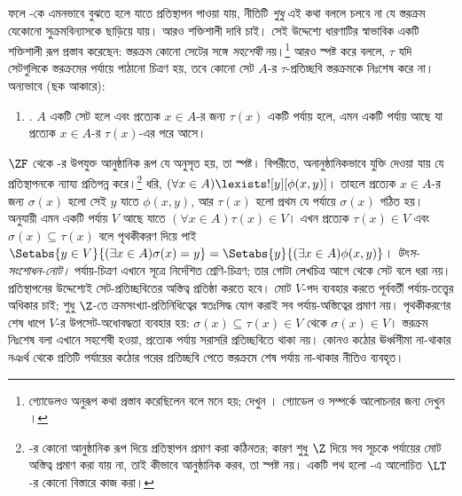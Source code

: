 \documentclass[../../../include/open-logic-section]{subfiles}
\begin{document}
ফলে \stagesinex{}-কে এমনভাবে বুঝতে
হলে যাতে প্রতিস্থাপন পাওয়া যায়,
নীতিটি \emph{শুধু} এই কথা বললে চলবে না
যে স্তরক্রম যেকোনো সুক্রমবিন্যাসকে
ছাড়িয়ে যায়। আরও শক্তিশালী দাবি চাই।
সেই উদ্দেশ্যে \cite{Shoenfield:AST}
ধারণাটির স্বাভাবিক একটি শক্তিশালী রূপ
প্রস্তাব করেছেন: স্তরক্রম কোনো সেটের
সঙ্গে \emph{সহশেষী} নয়।\footnote{গ্যোডেলও
অনুরূপ কথা প্রস্তাব করেছিলেন বলে মনে হয়;
দেখুন \citet[p.~223]{Potter2004}। গ্যোডেল
ও \citeauthor{Shoenfield:AST} সম্পর্কে
আলোচনার জন্য দেখুন
\citet[90--5]{Incurvati2020}।}
আরও স্পষ্ট করে বললে, $\tau$ যদি
সেটগুলিকে স্তরক্রমের পর্যায়ে পাঠানো
চিত্রণ হয়, তবে কোনো সেট $A$-র
$\tau$-প্রতিচ্ছবি স্তরক্রমকে নিঃশেষ
করে না। অন্যভাবে (ছক আকারে):
\begin{enumerate}
	\item[] \stagescofin. $A$ একটি সেট হলে
	এবং প্রত্যেক $x \in A$-র জন্য
	$\tau(x)$ একটি পর্যায় হলে, এমন একটি
	পর্যায় আছে যা প্রত্যেক $x \in A$-র
	$\tau(x)$-এর পরে আসে।
\end{enumerate}
$\ZF$ থেকে \stagescofin-র উপযুক্ত
আনুষ্ঠানিক রূপ যে অনুসৃত হয়, তা স্পষ্ট।
বিপরীতে, অনানুষ্ঠানিকভাবে যুক্তি দেওয়া যায়
যে \stagescofin{} প্রতিস্থাপনকে ন্যায্য
প্রতিপন্ন করে।\footnote{\stagescofin-র
কোনো আনুষ্ঠানিক রূপ দিয়ে প্রতিস্থাপন
প্রমাণ করা কঠিনতর; কারণ শুধু $\Z$ দিয়ে
সব সূচকে পর্যায়ের মোট অস্তিত্ব প্রমাণ করা যায় না,
তাই \stagescofin{} কীভাবে আনুষ্ঠানিক
করব, তা স্পষ্ট নয়। একটি পথ হলো
-এ
আলোচিত $\LT$-র কোনো বিস্তারে কাজ করা।}
ধরি, $(\forall x \in A)\lexists![y][\phi(x,y)]$।
তাহলে প্রত্যেক $x \in A$-র জন্য
$\sigma(x)$ হলো সেই $y$ যাতে
$\phi(x,y)$, আর $\tau(x)$ হলো প্রথম
যে পর্যায়ে $\sigma(x)$ গঠিত হয়।
\stagescofin{} অনুযায়ী এমন একটি
পর্যায় $V$ আছে যাতে
$(\forall x \in A)\tau(x)\in V$।
এখন প্রত্যেক $\tau(x) \in V$ এবং
$\sigma(x) \subseteq \tau(x)$ বলে
পৃথকীকরণ দিয়ে পাই
$\Setabs{y
\in V}{(\exists x \in A)\sigma(x) = y} = \Setabs{y}{(\exists x \in
A)\phi(x,y)}$।
\emph{উৎস-সংশোধন-নোট।} পর্যায়-চিত্রণ এখানে সূত্রে নির্দেশিত
শ্রেণি-চিত্রণ; তার গোটা লেখচিত্র আগে থেকে সেট বলে ধরা নয়।
প্রতিস্থাপনের উদ্দেশ্যেই সেট-প্রতিচ্ছবিতের অস্তিত্ব প্রতিষ্ঠা করতে হবে।
মোট $V$-পদ ব্যবহার করতে পূর্ববর্তী পর্যায়-তত্ত্বের অধিকার চাই;
শুধু $\Z$-তে ক্রমসংখ্যা-প্রতিনিধিত্বের স্বতঃসিদ্ধ যোগ করাই সব
পর্যায়-অস্তিত্বের প্রমাণ নয়। পৃথকীকরণের শেষ ধাপে $V$-র
উপসেট-অধোবদ্ধতা ব্যবহার হয়: $\sigma(x)\subseteq\tau(x)\in V$
থেকে $\sigma(x)\in V$। স্তরক্রম নিঃশেষ বলা এখানে সহশেষী
হওয়া, প্রত্যেক পর্যায় সরাসরি প্রতিচ্ছবিতে থাকা নয়। কোনও কঠোর
ঊর্ধ্বসীমা না-থাকার নঞর্থ থেকে প্রতিটি পর্যায়ের কঠোর পরের
প্রতিচ্ছবি পেতে স্তরক্রমে শেষ পর্যায় না-থাকার নীতিও ব্যবহৃত।
\end{document}

